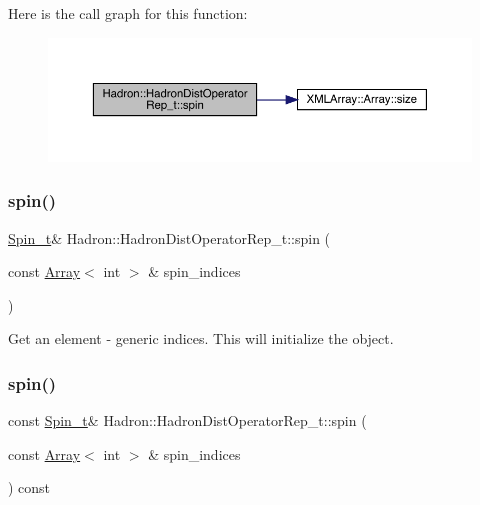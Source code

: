 Here is the call graph for this function\+:
\nopagebreak
\begin{figure}[H]
\begin{center}
\leavevmode
\includegraphics[width=350pt]{dd/de0/classHadron_1_1HadronDistOperatorRep__t_ad889e6377702e72419f259860142225f_cgraph}
\end{center}
\end{figure}
\mbox{\label{classHadron_1_1HadronDistOperatorRep__t_a5a70f79b843bb042a113d74798c3ed3d}} 
\subsubsection{\texorpdfstring{spin()}{spin()}\hspace{0.1cm}{\footnotesize\ttfamily [14/16]}}
{\footnotesize\ttfamily \mbox{\hyperlink{structHadron_1_1HadronDistOperatorRep__t_1_1Spin__t}{Spin\+\_\+t}}\& Hadron\+::\+Hadron\+Dist\+Operator\+Rep\+\_\+t\+::spin (\begin{DoxyParamCaption}\item[{const \mbox{\hyperlink{classXMLArray_1_1Array}{Array}}$<$ int $>$ \&}]{spin\+\_\+indices }\end{DoxyParamCaption})}



Get an element -\/ generic indices. This will initialize the object. 

\mbox{\label{classHadron_1_1HadronDistOperatorRep__t_a30c269c3646ef76094aecedcc745f611}} 
\subsubsection{\texorpdfstring{spin()}{spin()}\hspace{0.1cm}{\footnotesize\ttfamily [15/16]}}
{\footnotesize\ttfamily const \mbox{\hyperlink{structHadron_1_1HadronDistOperatorRep__t_1_1Spin__t}{Spin\+\_\+t}}\& Hadron\+::\+Hadron\+Dist\+Operator\+Rep\+\_\+t\+::spin (\begin{DoxyParamCaption}\item[{const \mbox{\hyperlink{classXMLArray_1_1Array}{Array}}$<$ int $>$ \&}]{spin\+\_\+indices }\end{DoxyParamCaption}) const}



